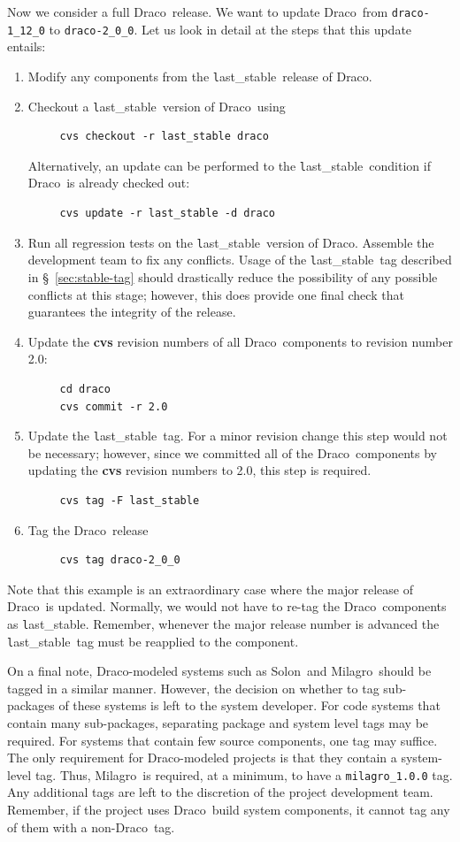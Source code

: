 \documentclass[11pt]{nmemo}
\newcommand{\draco}{{\normalfont\normalsize\textsf Draco}}
\newcommand{\milagro}{{\normalfont\normalsize\textsf Milagro}}
\newcommand{\solon}{{\normalfont\normalsize\textsf Solon}}
\newcommand{\stable}{{\normalfont\normalsize\texttt last\_stable}}
\begin{document}
Now we consider a full \draco\ release.  We want to update \draco\
from \texttt{draco-1\_12\_0} to \texttt{draco-2\_0\_0}.  Let us look
in detail at the steps that this update entails:
\begin{enumerate}
\item Modify any components from the \stable\ release of \draco.
\item Checkout a \stable\ version of \draco\ using
\begin{verbatim}
     cvs checkout -r last_stable draco
\end{verbatim}
  Alternatively, an update can be performed to the \stable\ condition
  if \draco\ is already checked out:
\begin{verbatim}
     cvs update -r last_stable -d draco
\end{verbatim}
\item Run all regression tests on the \stable\ version of \draco.
  Assemble the development team to fix any conflicts.  Usage of the
  \stable\ tag described in \S~\ref{sec:stable-tag} should drastically 
  reduce the possibility of any possible conflicts at this stage;
  however, this does provide one final check that guarantees the
  integrity of the release.
\item Update the {\bf cvs} revision numbers of all \draco\ components
  to revision number 2.0:
\begin{verbatim}
     cd draco
     cvs commit -r 2.0
\end{verbatim}
\item Update the \stable\ tag.  For a minor revision change this step
  would not be necessary; however, since we committed all of the
  \draco\ components by updating the {\bf cvs} revision numbers to
  2.0, this step is required.
\begin{verbatim}
     cvs tag -F last_stable
\end{verbatim}
\item Tag the \draco\ release
\begin{verbatim}
     cvs tag draco-2_0_0
\end{verbatim}
\end{enumerate}
Note that this example is an extraordinary case where the major
release of \draco\ is updated.  Normally, we would not have to re-tag
the \draco\ components as \stable.  Remember, whenever the major
release number is advanced the \stable\ tag must be reapplied to the
component.

On a final note, \draco-modeled systems such as \solon\ and \milagro\ 
should be tagged in a similar manner.  However, the decision on
whether to tag sub-packages of these systems is left to the system
developer.  For code systems that contain many sub-packages,
separating package and system level tags may be required.  For systems
that contain few source components, one tag may suffice.  The only
requirement for \draco-modeled projects is that they contain a
system-level tag.  Thus, \milagro\ is required, at a minimum, to have
a \texttt{milagro\_1.0.0} tag.  Any additional tags are left to the
discretion of the project development team.  Remember, if the project
uses \draco\ build system components, it cannot tag any of them with a
non-\draco\ tag.
\end{document}
